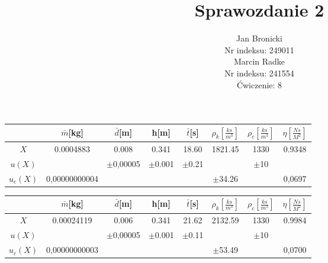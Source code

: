 \documentclass{article}
\title{Sprawozdanie 2}
\author{Jan Bronicki \\
Nr indeksu: 249011\\
Marcin Radke\\
Nr indeksu: 241554\\
Ćwiczenie: 8}
\date{}
\begin{document}
\maketitle
\renewcommand{\arraystretch}{1.3}
\begin{tabular}{|c|c|c|c|c|c|c|c|}
    \hline
    &$\bar{m}$[kg]&$\bar{d}$[m]&h[m]&$\bar{t}$[s]&$\rho_{k}\left[\frac{ks}{m^{3}}\right]$&$\rho_{c}$$\left[\frac{ks}{m^{3}}\right]$&$\eta\left[\frac{Ns}{M^{2}}\right]$\\
    \hline 
    $X$ &0.0004883&0.008&0.341&18.60&1821.45&1330&0.9348\\\hline
    $u(X)$&\cellcolor{gray}&$\pm$0,00005&$\pm$0.001&$\pm$0.21&\cellcolor{gray}&$\pm$10&\cellcolor{gray}    \\\hline
    $u_{c}(X)$&0,00000000004&\cellcolor{gray}&\cellcolor{gray}&\cellcolor{gray}&$\pm$34.26&\cellcolor{gray}&0,0697\\\hline
\end{tabular}

\begin{tabular}{|c|c|c|c|c|c|c|c|}
    \hline
    \cellcolor{gray!50}&\cellcolor{gray!50}$\bar{m}$[kg]&\cellcolor{gray!50}$\bar{d}$[m]&\cellcolor{gray!50}h[m]&\cellcolor{gray!50}$\bar{t}$[s]&\cellcolor{gray!50}$\rho_{k}\left[\frac{ks}{m^{3}}\right]$&\cellcolor{gray!50}$\rho_{c}$$\left[\frac{ks}{m^{3}}\right]$&\cellcolor{gray!50}$\eta\left[\frac{Ns}{M^{2}}\right]$\\
    \hline 
    \cellcolor{gray!50}$X$ &\cellcolor{gray!50}0.00024119&\cellcolor{gray!50}0.006&\cellcolor{gray!50}0.341&\cellcolor{gray!50}21.62&\cellcolor{gray!50}2132.59&\cellcolor{gray!50}1330&\cellcolor{gray!50}0.9984\\\hline
    \cellcolor{gray!50}$u(X)$&\cellcolor{gray}&\cellcolor{gray!50}$\pm$0,00005&\cellcolor{gray!50}$\pm$0.001&\cellcolor{gray!50}$\pm$0.11&\cellcolor{gray}&\cellcolor{gray!50}$\pm$10&\cellcolor{gray}    \\\hline
    \cellcolor{gray!50}$u_{c}(X)$&\cellcolor{gray!50}0,00000000003&\cellcolor{gray}&\cellcolor{gray}&\cellcolor{gray}&\cellcolor{gray!50}$\pm$53.49&\cellcolor{gray}&\cellcolor{gray!50}0,0700\\\hline
\end{tabular}
\end{document}
